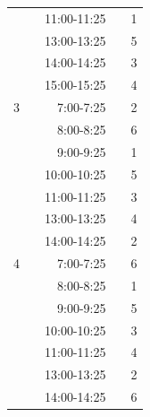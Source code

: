\documentclass[12pt,a4paper,titlepage]{article}
\begin{document}
\begin{table}[!htb]
\begin{tabular}{lllll}
\multicolumn{1}{c}{} & \multicolumn{1}{c}{} & \multicolumn{1}{r}{11:00-11:25} & \multicolumn{1}{r}{} & \multicolumn{1}{c}{1} \\
\multicolumn{1}{c}{} & \multicolumn{1}{c}{} & \multicolumn{1}{r}{13:00-13:25} & \multicolumn{1}{r}{} & \multicolumn{1}{c}{5} \\
\multicolumn{1}{c}{} & \multicolumn{1}{c}{} & \multicolumn{1}{r}{14:00-14:25} & \multicolumn{1}{r}{} & \multicolumn{1}{c}{3} \\
\multicolumn{1}{c}{} & \multicolumn{1}{c}{} & \multicolumn{1}{r}{15:00-15:25} & \multicolumn{1}{r}{} & \multicolumn{1}{c}{4} \\
\multicolumn{1}{c}{3} & \multicolumn{1}{c}{} & \multicolumn{1}{r}{7:00-7:25} & \multicolumn{1}{r}{} & \multicolumn{1}{c}{2} \\
\multicolumn{1}{c}{} & \multicolumn{1}{c}{} & \multicolumn{1}{r}{8:00-8:25} & \multicolumn{1}{r}{} & \multicolumn{1}{c}{6} \\
\multicolumn{1}{c}{} & \multicolumn{1}{c}{} & \multicolumn{1}{r}{9:00-9:25} & \multicolumn{1}{r}{} & \multicolumn{1}{c}{1} \\
\multicolumn{1}{c}{} & \multicolumn{1}{c}{} & \multicolumn{1}{r}{10:00-10:25} & \multicolumn{1}{r}{} & \multicolumn{1}{c}{5} \\
\multicolumn{1}{c}{} & \multicolumn{1}{c}{} & \multicolumn{1}{r}{11:00-11:25} & \multicolumn{1}{r}{} & \multicolumn{1}{c}{3} \\
\multicolumn{1}{c}{} & \multicolumn{1}{c}{} & \multicolumn{1}{r}{13:00-13:25} & \multicolumn{1}{r}{} & \multicolumn{1}{c}{4} \\
\multicolumn{1}{c}{} & \multicolumn{1}{c}{} & \multicolumn{1}{r}{14:00-14:25} & \multicolumn{1}{r}{} & \multicolumn{1}{c}{2} \\
\multicolumn{1}{c}{4} & \multicolumn{1}{c}{} & \multicolumn{1}{r}{7:00-7:25} & \multicolumn{1}{r}{} & \multicolumn{1}{c}{6} \\
\multicolumn{1}{c}{} & \multicolumn{1}{c}{} & \multicolumn{1}{r}{8:00-8:25} & \multicolumn{1}{r}{} & \multicolumn{1}{c}{1} \\
\multicolumn{1}{c}{} & \multicolumn{1}{c}{} & \multicolumn{1}{r}{9:00-9:25} & \multicolumn{1}{r}{} & \multicolumn{1}{c}{5} \\
\multicolumn{1}{c}{} & \multicolumn{1}{c}{} & \multicolumn{1}{r}{10:00-10:25} & \multicolumn{1}{r}{} & \multicolumn{1}{c}{3} \\
\multicolumn{1}{c}{} & \multicolumn{1}{c}{} & \multicolumn{1}{r}{11:00-11:25} & \multicolumn{1}{r}{} & \multicolumn{1}{c}{4} \\
\multicolumn{1}{c}{} & \multicolumn{1}{c}{} & \multicolumn{1}{r}{13:00-13:25} & \multicolumn{1}{r}{} & \multicolumn{1}{c}{2} \\
\multicolumn{1}{c}{} & \multicolumn{1}{c}{} & \multicolumn{1}{r}{14:00-14:25} & \multicolumn{1}{r}{} & \multicolumn{1}{c}{6} \\
\hline
\end{tabular}
\end{table}
\end{document}
